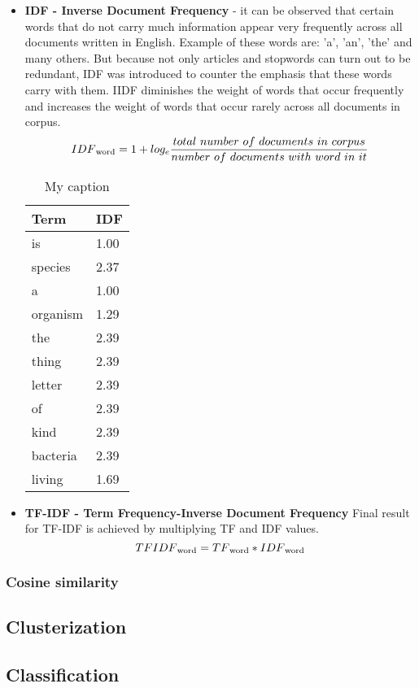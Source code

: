 \begin{itemize}
	\item \textbf{IDF - Inverse Document Frequency} - it can be observed that certain words that do not carry much information appear very frequently across all documents written in English. Example of these words are: 'a', 'an', 'the' and many others. But because not only articles and stopwords can turn out to be redundant, IDF was introduced to counter the emphasis that these words carry with them. IIDF diminishes the weight of words that occur frequently and increases the weight of words that occur rarely across all documents in corpus.
	\[IDF\textsubscript{word}=1+log_e \frac{total\ number\ of\ documents\ in\ corpus}{number\ of\ documents\ with\ word\ in\ it}\]
	
	\begin{table}[ht]
		\centering
		\caption{My caption}
		\label{my-label}
		\begin{tabular}{@{}ll@{}}
			\toprule
			Term     & IDF  \\ \midrule
			is       & 1.00 \\
			species  & 2.37 \\
			a        & 1.00 \\
			organism & 1.29 \\
			the      & 2.39 \\
			thing    & 2.39 \\
			letter   & 2.39 \\
			of       & 2.39 \\
			kind     & 2.39 \\
			bacteria & 2.39 \\
			living   & 1.69 \\ \bottomrule
		\end{tabular}
	\end{table}
	
	\item \textbf{TF-IDF - Term Frequency-Inverse Document Frequency}
	Final result for TF-IDF is achieved by multiplying TF and IDF values.
	\[TFIDF\textsubscript{word}=TF\textsubscript{word} * IDF\textsubscript{word}\]
\end{itemize}

\subsubsection{Cosine similarity}

\subsection{Clusterization}
\subsection{Classification}